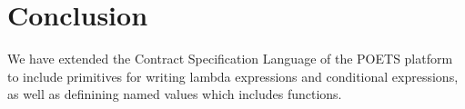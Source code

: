\documentclass[10pt,a4paper,final,oneside,openany,article]{memoir}
\begin{document}
\chapter{Conclusion}
We have extended the Contract Specification Language of the POETS
platform to include primitives for writing lambda expressions and
conditional expressions, as well as definining named values which
includes functions. 

\printbibliography





\end{document}
